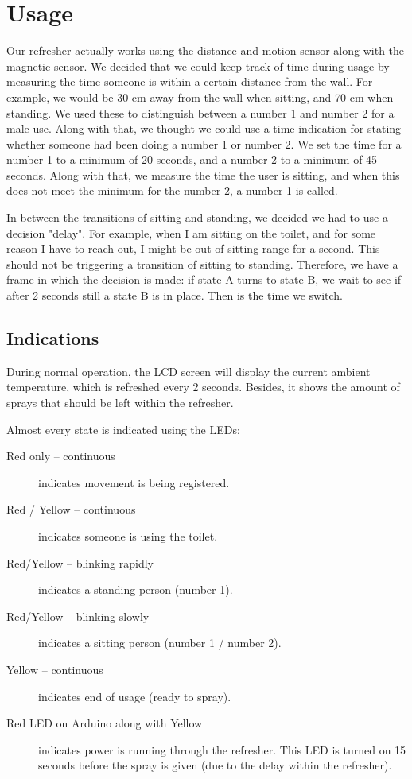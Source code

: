\documentclass[a4paper, 12pt]{article}
\begin{document}
\section{Usage}
Our refresher actually works using the distance and motion sensor along with the magnetic sensor. We decided that we could keep track of time during usage by measuring the time someone is within a certain distance from the wall. For example, we would be 30 cm away from the wall when sitting, and 70 cm when standing. We used these to distinguish between a number 1 and number 2 for a male use. Along with that, we thought we could use a time indication for stating whether someone had been doing a number 1 or number 2. We set the time for a number 1 to a minimum of 20 seconds, and a number 2 to a minimum of 45 seconds. Along with that, we measure the time the user is sitting, and when this does not meet the minimum for the number 2, a number 1 is called.

In between the transitions of sitting and standing, we decided we had to use a decision "delay". For example, when I am sitting on the toilet, and for some reason I have to reach out, I might be out of sitting range for a second. This should not be triggering a transition of sitting to standing. Therefore, we have a frame in which the decision is made: if state A turns to state B, we wait to see if after 2 seconds still a state B is in place. Then is the time we switch.

\subsection{Indications}
During normal operation, the LCD screen will display the current ambient temperature, which is refreshed every 2 seconds. Besides, it shows the amount of sprays that should be left within the refresher. 

Almost every state is indicated using the LEDs:
\begin{description}
\item[Red only -- continuous] indicates movement is being registered.
\item[Red / Yellow -- continuous] indicates someone is using the toilet.
\item[Red/Yellow -- blinking rapidly] indicates a standing person (number 1).
\item[Red/Yellow -- blinking slowly] indicates a sitting person (number 1 / number 2).
\item[Yellow -- continuous] indicates end of usage (ready to spray).
\item[Red LED on Arduino along with Yellow] indicates power is running through the refresher. This LED is turned on 15 seconds before the spray is given (due to the delay within the refresher).  
\end{description}
\end{document}
